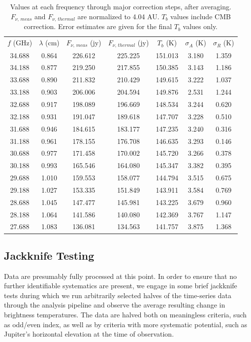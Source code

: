 \documentclass{article}
\newcommand{\tableend}{\\}
\begin{document}
	\begin{table}
	\centering
	\begin{tabular}{cc || c | c | c | c | c }
	$f$ (GHz) & $\lambda$ (cm) & $F_{\nu,\,meas}$ (jy) & $F_{\nu,\,thermal}$ (jy) & $T_b$ (K) & $\sigma_{A}$ (K) & $\sigma_{R}$ (K) \\\hhline{==#=|=|=|=|=}
	34.688 & 0.864 & 226.612 & 225.225 & 151.013 & 3.180 & 1.359 \tableend
	34.188 & 0.877 & 219.250 & 217.855 & 150.385 & 3.143 & 1.186 \tableend
	33.688 & 0.890 & 211.832 & 210.429 & 149.615 & 3.222 & 1.037 \tableend
	33.188 & 0.903 & 206.006 & 204.594 & 149.876 & 2.531 & 1.244 \tableend
	32.688 & 0.917 & 198.089 & 196.669 & 148.534 & 3.244 & 0.620 \tableend
	32.188 & 0.931 & 191.047 & 189.618 & 147.707 & 3.228 & 0.510 \tableend
	31.688 & 0.946 & 184.615 & 183.177 & 147.235 & 3.240 & 0.316 \tableend
	31.188 & 0.961 & 178.155 & 176.708 & 146.635 & 3.293 & 0.146 \tableend
	30.688 & 0.977 & 171.458 & 170.002 & 145.720 & 3.266 & 0.378 \tableend
	30.188 & 0.993 & 165.546 & 164.080 & 145.347 & 3.382 & 0.395 \tableend
	29.688 & 1.010 & 159.553 & 158.077 & 144.794 & 3.515 & 0.675 \tableend
	29.188 & 1.027 & 153.335 & 151.849 & 143.911 & 3.584 & 0.769 \tableend
	28.688 & 1.045 & 147.477 & 145.981 & 143.225 & 3.679 & 0.960 \tableend
	28.188 & 1.064 & 141.586 & 140.080 & 142.369 & 3.767 & 1.147 \tableend
	27.688 & 1.083 & 136.081 & 134.563 & 141.757 & 3.875 & 1.368 \tableend
	\end{tabular}
	\caption{\label{tab:1}Values at each frequency through major correction steps, after averaging. $F_{\nu,\,meas}$ and $F_{\nu,\,thermal}$ are normalized to 4.04 AU. $T_b$ values include CMB correction. Error estimates are given for the final $T_b$ values only.}
	\end{table}


\subsection{Jackknife Testing} \label{s:jackknife}

	Data are presumably fully processed at this point.
	In order to ensure that no further identifiable systematics are present, we engage in some brief jackknife tests during which we run arbitrarily selected halves of the time-series data through the analysis pipeline and observe the average resulting change in brightness temperatures.
	The data are halved both on meaningless criteria, such as odd/even index, as well as by criteria with more systematic potential, such as Jupiter's horizontal elevation at the time of observation.
\end{document}

